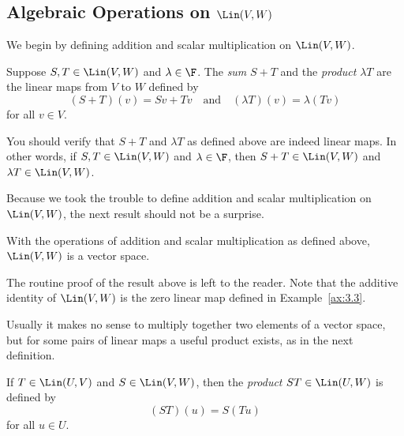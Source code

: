 \subsection{\texorpdfstring{Algebraic Operations on $\Lin(V,W)$}{Algebraic
Operations on L(V,W)}}

We begin by defining addition and scalar multiplication on $\Lin(V,W)$.

\begin{definition}\label{ax:3.5}
Suppose $S,T\in\Lin(V,W)$ and $\lambda\in\F$. The \emph{sum} $S+T$ and the
\emph{product} $\lambda T$ are the linear maps from $V$ to $W$ defined by
\[ (S+T)(v)=Sv+Tv \quad\text{and}\quad (\lambda T)(v)=\lambda(Tv) \]
for all $v\in V$.
\end{definition}

%
You should verify that $S+T$ and $\lambda T$ as defined above are indeed linear
maps. In other words, if $S,T\in\Lin(V,W)$ and $\lambda\in\F$, then
$S+T\in\Lin(V,W)$ and $\lambda T\in\Lin(V,W)$.

Because we took the trouble to define addition and scalar multiplication on
$\Lin(V,W)$, the next result should not be a surprise.

\begin{result}\label{ax:3.6}
With the operations of addition and scalar multiplication as defined above,
$\Lin(V,W)$ is a vector space.
\end{result}

The routine proof of the result above is left to the reader. Note that the
additive identity of $\Lin(V,W)$ is the zero linear map defined in
Example~\ref{ax:3.3}.

Usually it makes no sense to multiply together two elements of a vector space,
but for some pairs of linear maps a useful product exists, as in the next
definition.

\begin{definition}\label{ax:3.7}
If $T\in\Lin(U,V)$ and $S\in\Lin(V,W)$, then the \emph{product}
$ST\in\Lin(U,W)$ is defined by
\[ (ST)(u)=S(Tu) \]
for all $u\in U$.
\end{definition}


